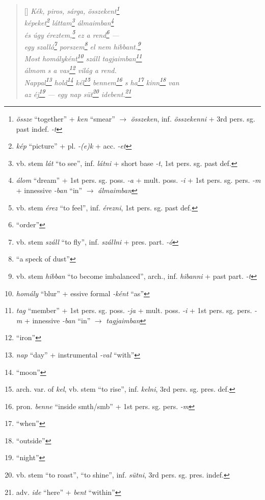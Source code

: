 \documentclass[a4paper,12pt,twoside,final]{book}
\begin{document}
\begin{verse}[\versewidth]
  \it
  Kék, piros, sárga, összekent\footnote{\emph{össze} ``together'' +
  \emph{ken} ``smear'' $\rightarrow$ \emph{összeken},
  inf. \emph{összekenni} + 3rd pers. sg. past indef. \emph{-t}} \\
  képeket\footnote{\emph{kép} ``picture'' + pl. \emph{-(e)k} +
  acc. \emph{-et}} láttam\footnote{vb. stem \emph{lát} ``to see'',
  inf. \emph{látni} + short base \emph{-t}, 1st pers. sg. past
  def.} álmaimban\footnote{\emph{álom} ``dream'' +
  1st pers. sg. poss. \emph{-a} + mult. poss. \emph{-i} + 1st
  pers. sg. pers. \emph{-m} + innessive \emph{-ban} ``in'' $\rightarrow$
  \emph{álmaimban}} \\
  és úgy éreztem,\footnote{vb. stem \emph{érez} ``to feel'',
  inf. \emph{érezni}, 1st pers. sg. past def.} ez a
  rend\footnote{``order''} --- \\
  egy szalló\footnote{vb. stem \emph{száll} ``to fly'',
  inf. \emph{szállni} + pres. part. \emph{-ó}} porszem\footnote{``a
  speck of dust''} el nem hibbant.\footnote{vb. stem \emph{hibban}
  ``to become imbalanced'', arch., inf. \emph{hibanni} + past
  part. \emph{-t}} \\
  Most homályként\footnote{\emph{homály} ``blur'' +
  essive formal \emph{-ként} ``as''} száll tagjaimban\footnote{\emph{tag}
  ``member'' + 1st pers. sg. poss. \emph{-ja} +
  mult. poss. \emph{-i} + 1st pers. sg. pers. \emph{-m} +
  innessive \emph{-ban} ``in'' $\rightarrow$ \emph{tagjaimban}} \\
  álmom s a vas\footnote{``iron''} világ a rend. \\
  Nappal\footnote{\emph{nap} ``day'' + instrumental \emph{-val}
  ``with''} hold\footnote{``moon''} kél\footnote{arch. var.
  of \emph{kel}, vb. stem ``to rise'', inf. \emph{kelni}, 3rd
  pers. sg. pres. def.} bennem\footnote{pron. \emph{benne} ``inside
  smth/smb'' + 1st pers. sg. pers. \emph{-m}} s ha\footnote{``when''}
  kinn\footnote{``outside''} van  \\
  az éj\footnote{``night''} --- egy nap süt\footnote{vb. stem ``to
  roast'', ``to shine'', inf. \emph{sütni}, 3rd pers. sg. pres. indef.}
  idebent.\footnote{adv. \emph{ide} ``here'' + \emph{bent} ``within''}
\end{verse}

\end{document}
